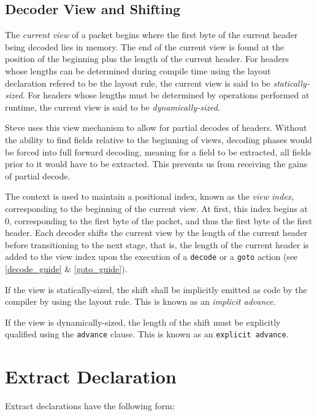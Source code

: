 \subsection{Decoder View and Shifting} \label{decoder_view}

The \textit{current view} of a packet begins where the first byte of the current header being decoded lies in memory. The end of the current view is found at the position of the beginning plus the length of the current header. For headers whose lengths can be determined during compile time using the layout declaration refered to be the layout rule, the current view is said to be \textit{statically-sized}. For headers whose lengths must be determined by operations performed at runtime, the current view is said to be \textit{dynamically-sized}.

Steve uses this view mechanism to allow for partial decodes of headers. Without the ability to find fields relative to the beginning of views, decoding phases would be forced into full forward decoding, meaning for a field to be extracted, all fields prior to it would have to be extracted. This prevents us from receiving the gains of partial decode.

The context is used to maintain a positional index, known as the \textit{view index}, corresponding to the beginning of the current view. At first, this index begins at 0, corresponding to the first byte of the packet, and thus the first byte of the first header. Each decoder shifts the current view by the length of the current header before transitioning to the next stage, that is, the length of the current header is added to the view index upon the execution of a \texttt{decode} or a \texttt{goto} action (see \ref{decode_guide} \& \ref{goto_guide}).

If the view is statically-sized, the shift shall be implicitly emitted as code by the compiler by using the layout rule. This is known as an \textit{implicit advance}.

If the view is dynamically-sized, the length of the shift must be explicitly qualified using the \texttt{\color{blue}advance} clause. This is known as an \texttt{explicit advance}.

\section{Extract Declaration} \label{extract_guide}

Extract declarations have the following form:

